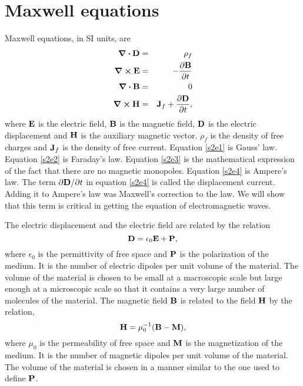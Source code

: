 \documentclass[11pt]{article}
\numberwithin{equation}{section}
\begin{document}
\section{Maxwell equations}\label{s2}
Maxwell equations, in SI units, are
\begin{eqnarray}
\div\vb{D} &=& \rho_f \label{s2e1} \\
\curl\vb{E} &=& -\pdv{\vb{B}}{t} \label{s2e2} \\
\div\vb{B} &=& 0 \label{s2e3} \\
\curl\vb{H} &=& \vb{J}_f + \pdv{\vb{D}}{t}, \label{s2e4}
\end{eqnarray}
where $\vb{E}$ is the electric field, $\vb{B}$ is the magnetic field,
$\vb{D}$ is the electric displacement and $\vb{H}$ is the auxiliary magnetic
vector. $\rho_f$ is the density of free charges and $\vb{J}_f$ is the 
density of free current. Equation \eqref{s2e1} is Gauss' law. Equation
\eqref{s2e2} is Faraday's law. Equation \eqref{s2e3} is the mathematical
expression of the fact that there are no magnetic monopoles. Equation
\eqref{s2e4} is Ampere's law. The term $\partial\vb{D}/\partial t$ in equation
\eqref{s2e4} is called the displacement current. Adding it to Ampere's law
was Maxwell's correction to the law. We will show that this term is critical
in getting the equation of electromagnetic waves.

The electric displacement and the electric field
are related by the relation
\begin{equation}\label{s2e5}
\vb{D} = \epsilon_0\vb{E} + \vb{P},
\end{equation}
where $\epsilon_0$ is the permittivity of free space and $\vb{P}$ is the
polarization of the medium. It is the number of electric dipoles per unit
volume of the material. The volume of the material is chosen to be small at
a macroscopic scale but large enough at a microscopic scale so that it contains
a very large number of molecules of the material. The magnetic field $\vb{B}$
is related to the field $\vb{H}$ by the relation,
\begin{equation}\label{s2e6}
\vb{H} = \mu_0^{-1}(\vb{B} - \vb{M}),
\end{equation}
where $\mu_0$ is the permeability of free space and $\vb{M}$ is the 
magnetization of the medium. It is the number of magnetic dipoles per unit
volume of the material. The volume of the material is chosen in a manner 
similar to the one used to define $\vb{P}$. 
\end{document}
